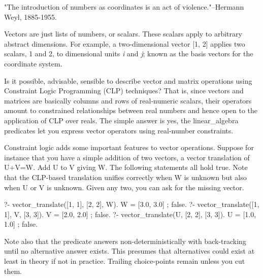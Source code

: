 "The introduction of numbers as coordinates is an act of
violence."--Hermann Weyl, 1885-1955.

Vectors are just lists of numbers, or scalars. These scalars apply to
arbitrary abstract dimensions. For example, a two-dimensional vector
[1, 2] applies two scalars, 1 and 2, to dimensional units \textit{i} and
\textit{j}; known as the basis vectors for the coordinate system.

Is it possible, advisable, sensible to describe vector and matrix
operations using Constraint Logic Programming (CLP) techniques? That
is, since vectors and matrices are basically columns and rows of
real-numeric scalars, their operators amount to constrained
relationships between real numbers and hence open to the application
of CLP over reals. The simple answer is yes, the linear_algebra
predicates let you express vector operators using real-number
constraints.

Constraint logic adds some important features to vector operations.
Suppose for instance that you have a simple addition of two vectors,
a vector translation of U+V=W. Add U to V giving W. The following
statements all hold true. Note that the CLP-based translation unifies
correctly when W is unknown but also when U or V is unknown. Given
any two, you can ask for the missing vector.

\begin{code}
?- vector_translate([1, 1], [2, 2], W).
W = [3.0, 3.0] ;
false.
?- vector_translate([1, 1], V, [3, 3]).
V = [2.0, 2.0] ;
false.
?- vector_translate(U, [2, 2], [3, 3]).
U = [1.0, 1.0] ;
false.
\end{code}

Note also that the predicate answers non-deterministically with
back-tracking until no alternative answer exists. This presumes that
alternatives could exist at least in theory if not in practice.
Trailing choice-points remain unless you cut them.\vspace{0.7cm}


